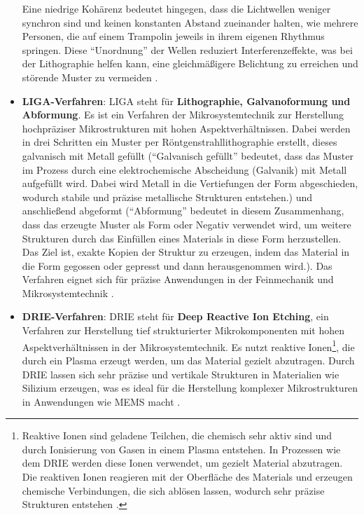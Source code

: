 \documentclass{article} %
\begin{document}
\begin{itemize}
    Eine niedrige Kohärenz bedeutet hingegen, dass die Lichtwellen weniger synchron sind und keinen konstanten Abstand zueinander halten, wie mehrere Personen, die auf einem Trampolin jeweils in ihrem eigenen Rhythmus springen. Diese ``Unordnung'' der Wellen reduziert Interferenzeffekte, was bei der Lithographie helfen kann, eine gleichmäßigere Belichtung zu erreichen und störende Muster zu vermeiden \cite{Mack2006}.
    \item \textbf{LIGA-Verfahren}: LIGA steht für \textbf{Lithographie, Galvanoformung und Abformung}. Es ist ein Verfahren der Mikrosystemtechnik zur Herstellung hochpräziser Mikrostrukturen mit hohen Aspektverhältnissen. Dabei werden in drei Schritten ein Muster per Röntgenstrahllithographie erstellt, dieses galvanisch mit Metall gefüllt (``Galvanisch gefüllt'' bedeutet, dass das Muster im Prozess durch eine elektrochemische Abscheidung (Galvanik) mit Metall aufgefüllt wird. Dabei wird Metall in die Vertiefungen der Form abgeschieden, wodurch stabile und präzise metallische Strukturen entstehen.) und anschließend abgeformt (``Abformung'' bedeutet in diesem Zusammenhang, dass das erzeugte Muster als Form oder Negativ verwendet wird, um weitere Strukturen durch das Einfüllen eines Materials in diese Form herzustellen. Das Ziel ist, exakte Kopien der Struktur zu erzeugen, indem das Material in die Form gegossen oder gepresst und dann herausgenommen wird.). Das Verfahren eignet sich für präzise Anwendungen in der Feinmechanik und Mikrosystemtechnik \cite{Mescheder2004}.
    \item \textbf{DRIE-Verfahren}: DRIE steht für \textbf{Deep Reactive Ion Etching}, ein Verfahren zur Herstellung tief strukturierter Mikrokomponenten mit hohen Aspektverhältnissen in der Mikrosystemtechnik. Es nutzt reaktive Ionen\footnote{Reaktive Ionen sind geladene Teilchen, die chemisch sehr aktiv sind und durch Ionisierung von Gasen in einem Plasma entstehen. In Prozessen wie dem DRIE werden diese Ionen verwendet, um gezielt Material abzutragen. Die reaktiven Ionen reagieren mit der Oberfläche des Materials und erzeugen chemische Verbindungen, die sich ablösen lassen, wodurch sehr präzise Strukturen entstehen \cite{henning2002, wolf2000}.}, die durch ein Plasma erzeugt werden, um das Material gezielt abzutragen. Durch DRIE lassen sich sehr präzise und vertikale Strukturen in Materialien wie Silizium erzeugen, was es ideal für die Herstellung komplexer Mikrostrukturen in Anwendungen wie MEMS macht \cite{madou2002, li2014drie}.
\end{itemize}
\end{document}
